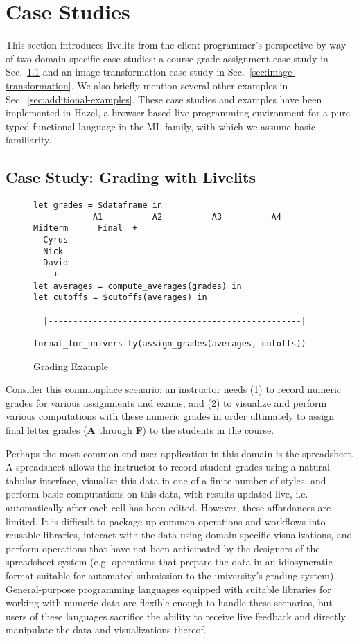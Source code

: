 \section{Case Studies}\label{sec:case-studies}
This section introduces livelits from the client programmer's perspective by way of 
two domain-specific case studies:
a course grade assignment case study in Sec.~\ref{sec:live-grading} 
and an image transformation case study in Sec.~\ref{sec:image-transformation}. 
We also briefly mention several other examples in Sec.~\ref{sec:additional-examples}. 
These case studies and examples have been implemented
in Hazel, a browser-based live programming environment for a pure typed functional language in the
ML family, with which we assume basic familiarity. 

\subsection{Case Study: Grading with Livelits}\label{sec:live-grading}
\begin{figure}
\begin{lstlisting}
let grades = $dataframe in 
            A1          A2          A3          A4       Midterm      Final  +
  Cyrus
  Nick
  David
    + 
let averages = compute_averages(grades) in 
let cutoffs = $cutoffs(averages) in 

  |---------------------------------------------------|

format_for_university(assign_grades(averages, cutoffs))
\end{lstlisting}
\caption{Grading Example}
\label{fig:grading}
\end{figure}

Consider this commonplace scenario: an instructor needs 
(1) to record numeric grades for various assignments and exams, and 
(2) to visualize and perform various computations with these numeric grades 
in order ultimately to assign final letter grades (\textbf{A} through \textbf{F}) to the students in the course.

Perhaps the most common end-user application in this domain is the spreadsheet.
A spreadsheet allows the instructor to record student grades using a natural tabular interface,
visualize this data in one of a finite number of styles, and perform basic computations on this data,
with results updated live, i.e. automatically after each cell has been edited. 
However, these affordances are limited. It is difficult to package up common operations and workflows 
into reusable libraries, interact with the data using domain-specific visualizations, 
and perform operations that have not been anticipated by the designers of the spreadsheet system 
(e.g. operations that prepare the data in an idiosyncratic format suitable for automated submission 
to the university's grading system). 
General-purpose programming languages equipped with suitable libraries for working with numeric data
are flexible enough to handle these scenarios, but users of these languages 
sacrifice the ability to receive live feedback and directly manipulate the data and visualizations thereof.

